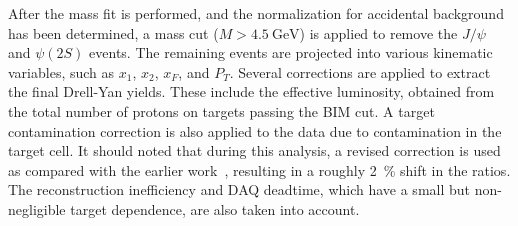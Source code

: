 \documentclass[reprint,aps,unsortedaddress,superscriptaddress,prc,floatfix,showpacs,linenumbers,final]{revtex4-2}
\begin{document}
After the mass fit is performed, and the normalization for accidental background has been determined,
a mass cut ($M>\SI{4.5}{\GeV}$) is applied to remove the $J/\psi$ and $\psi\left(2S\right)$ events.
The remaining events are projected into various kinematic variables, such as $x_1$, $x_2$, $x_F$, and $P_T$.
Several corrections are applied to extract the final Drell-Yan yields.
These include the effective luminosity, obtained from the total number of protons on targets passing the BIM cut.
A target contamination correction is also applied to the  data due to  contamination in the target cell.
It should noted that during this analysis,
a revised correction is used as compared with the earlier work~\cite{dove2021,dove2023},
resulting in a roughly \SI{2}{\percent} shift in the ratios.
The reconstruction inefficiency and DAQ deadtime, which have a small but non-negligible target dependence,
are also taken into account.
\end{document}

